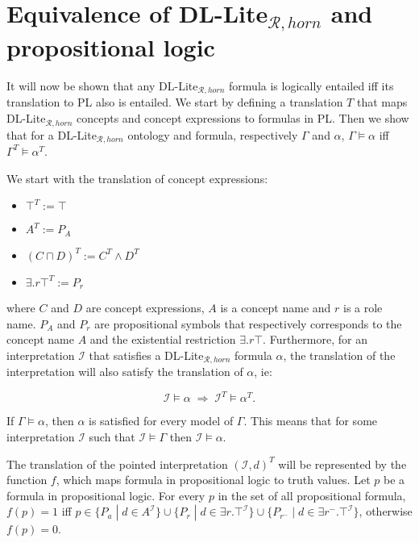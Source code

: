 \chapter{Equivalence of DL-Lite$_{\mathcal{R}, horn}$ and propositional logic}

\newtheorem{lemma}{Lemma}

It will now be shown that any DL-Lite$_{\mathcal{R}, horn}$ formula is logically entailed iff its translation to PL also is entailed. We start by defining a translation $T$ that maps DL-Lite$_{\mathcal{R}, horn}$ concepts and concept expressions to formulas in PL. Then we show that for a DL-Lite$_{\mathcal{R}, horn}$ ontology and formula, respectively $\Gamma$ and $\alpha$, $\Gamma \models \alpha$ iff $\Gamma^T \models \alpha^T$.

We start with the translation of concept expressions:
\begin{itemize}
    \item $\top^T := \top$
    \item $A^T := P_A$
    \item $(C \sqcap D)^T := C^T \wedge D^T$
    \item ${\exists .r\top}^T := P_r$
\end{itemize}
 where $C$ and $D$ are concept expressions, $A$ is a concept name and $r$ is a role name. $P_A$ and $P_r$ are propositional symbols that respectively corresponds to the concept name $A$ and the existential restriction $\exists .r\top$. Furthermore, for an interpretation $\mathcal{I}$ that satisfies a DL-Lite$_{\mathcal{R}, horn}$ formula $\alpha$, the translation of the interpretation will also satisfy the translation of $\alpha$, ie:
 
 \[\mathcal{I} \models \alpha \; \Rightarrow \;  \mathcal{I}^T \models \alpha^T.\]
 
If $\Gamma \models \alpha$, then $\alpha$ is satisfied for every model of $\Gamma$. This means that for some interpretation $\mathcal{I}$ such that $\mathcal{I} \models \Gamma$ then $\mathcal{I} \models \alpha$.

The translation of the pointed interpretation $(\mathcal{I}, d)^T$ will be represented by the function $f$, which maps formula in propositional logic to truth values. Let $p$ be a formula in propositional logic. For every $p$ in the set of all propositional formula, $f(p)=1$ iff $p\in \{P_a \; | \; d\in A^{\mathcal{I}}\}\cup\{P_r \; | \; d\in {\exists r.\top}^{\mathcal{I}}\}\cup \{P_{r^-} \; | \; d \in {\exists r^{-}.\top}^{\mathcal{I}}\}$, otherwise $f(p)=0$.
 
